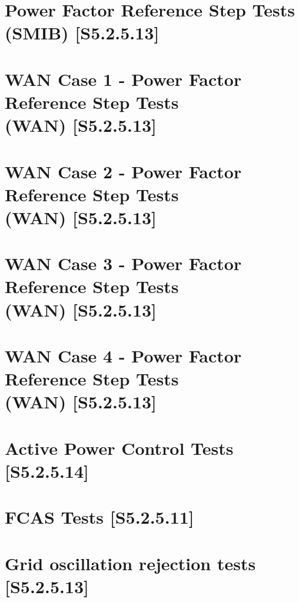 \documentclass{../grid-link-report}
\begin{document}
	\section{Power Factor Reference Step Tests (SMIB) [S5.2.5.13]}
	\label{Power Factor Reference Step Tests (SMIB) [S5.2.5.13]}
	
	\section{WAN Case 1 - Power Factor Reference Step Tests 
		\\
		(WAN) [S5.2.5.13]}
	\label{WAN Case 1 - Power Factor Reference Step Tests (WAN) [S5.2.5.13]}
	
	\section{WAN Case 2 - Power Factor Reference Step Tests 
		\\
		(WAN) [S5.2.5.13]}
	\label{WAN Case 2 - Power Factor Reference Step Tests (WAN) [S5.2.5.13]}
	
	\section{WAN Case 3 - Power Factor Reference Step Tests 
		\\
		(WAN) [S5.2.5.13]}
	\label{WAN Case 3 - Power Factor Reference Step Tests (WAN) [S5.2.5.13]}
	
	\section{WAN Case 4 - Power Factor Reference Step Tests 
		\\
		(WAN) [S5.2.5.13]}
	\label{WAN Case 4 - Power Factor Reference Step Tests (WAN) [S5.2.5.13]}
	
	\section{Active Power Control Tests [S5.2.5.14]}
	\label{Active Power Control Tests [S5.2.5.14]}
	
	\section{FCAS Tests [S5.2.5.11]}
	\label{FCAS Tests [S5.2.5.11]}

	\section{Grid oscillation rejection tests [S5.2.5.13]}
	\label{Grid oscillation rejection tests [S5.2.5.13]}
	
	
\end{document}
